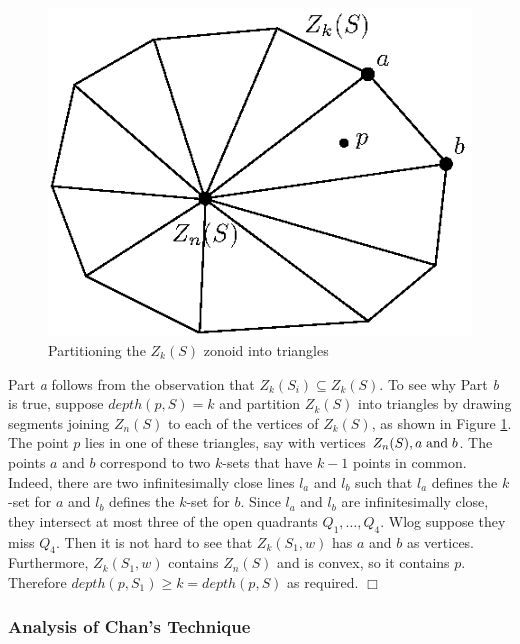 \documentclass{elsart}
\newenvironment{proof}{{\bf Proof:} \rm}{\hfill $\Box$ \medskip\\}
\begin{document}
\begin{figure}
 \begin{center}
   \includegraphics{fig7}
   \caption{\label{fig_for_proof}Partitioning the $Z_k(S)$ zonoid into triangles}
 \end{center}
\end{figure}

\begin{proof} Part \textit{a} follows from the observation that
$Z_k(S_i) \subseteq Z_k(S)$. To see why Part \textit{b} is true,
suppose $depth(p,S) = k$ and partition $Z_k(S)$ into triangles by
drawing segments joining $Z_n(S)$ to each of the vertices of $Z_k(S)$,
as shown in Figure \ref{fig_for_proof}. The point $p$ lies in one of
these triangles, say with vertices $Z_n(S), a \hspace{1mm} \mbox{and}
\hspace{1mm} b$. The points $a$ and $b$ correspond to two $k$-sets
that have $k-1$ points in common. Indeed, there are two
infinitesimally close lines $l_a$ and $l_b$ such that $l_a$ defines
the $k$-set for $a$ and $l_b$ defines the $k$-set for $b$. Since $l_a$
and $l_b$ are infinitesimally close, they intersect at most three of
the open quadrants $Q_1, \ldots, Q_4$. Wlog suppose they miss $Q_4$. Then
it is not hard to see that $Z_k(S_1,w)$ has $a$ and $b$ as vertices.
Furthermore, $Z_k(S_1,w)$ contains $Z_n(S)$ and is convex, so it
contains $p$. Therefore $depth(p,S_1) \ge k = depth(p,S)$ as required.
\end{proof}

\subsubsection{Analysis of Chan's Technique}
\end{document}
